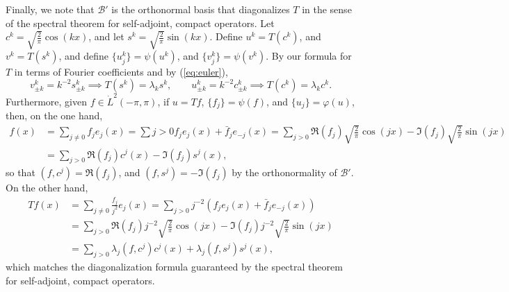 \documentclass{homework}
\begin{document}
\begin{arabicparts}
		Finally, we note that $\mathcal{B}'$ is the orthonormal basis that diagonalizes $T$ in the sense of the spectral theorem for self-adjoint, compact operators. Let $c^k = \sqrt{\frac{2}{\pi}}\cos(kx)$, and let $s^k = \sqrt{\frac{2}{\pi}}\sin(kx)$. Define $u^k = T(c^k)$, and $v^k = T(s^k)$, and define $\{u^k_j\} = \psi(u^k)$, and $\{v^k_j\} = \psi(v^k)$. By our formula for $T$ in terms of Fourier coefficients and by (\ref{eq:euler}),
		\begin{equation}
			v^k_{\pm k} = k^{-2}s^k_{\pm k} \implies T(s^k) = \lambda_ks^k, \qquad u^k_{\pm k} = k^{-2}c^k_{\pm k} \implies T(c^k) = \lambda_kc^k.
		\end{equation}
		Furthermore, given $f \in \dot{L}^2(-\pi,\pi)$, if $u = Tf$, $\{f_j\} = \psi(f)$, and $\{u_j\} = \varphi(u)$, then, on the one hand,
		\begin{align}
			f(x) &= \sum_{j\ne0}f_je_j(x) = \sum{j>0}f_je_j(x) + \bar{f}_{j}e_{-j}(x) = \sum_{j>0} \Re(f_j)\sqrt{\frac{2}{\pi}}\cos(jx) -\Im(f_j)\sqrt{\frac{2}{\pi}}\sin(jx) \\
			&= \sum_{j>0}\Re(f_j)c^j(x) - \Im(f_j)s^j(x),
		\end{align}
		so that $\left(f, c^j\right) = \Re(f_j)$, and $(f, s^j) = -\Im(f_j)$ by the orthonormality of $\mathcal{B}'$. On the other hand,
		\begin{align}
			Tf(x) &= \sum_{j\ne0}\frac{f_j}{j^2}e_j(x) = \sum_{j>0}j^{-2}(f_je_j(x) +\bar{f}_je_{-j}(x)) \\
			&= \sum_{j>0}\Re(f_j)j^{-2}\sqrt{\frac{2}{\pi}}\cos(jx) -\Im(f_j)j^{-2}\sqrt{\frac{2}{\pi}}\sin(jx) \\
			&= \sum_{j>0}\lambda_j(f,c^j)c^j(x) + \lambda_j(f,s^j)s^j(x),
		\end{align}
		which matches the diagonalization formula guaranteed by the spectral theorem for self-adjoint, compact operators.
	\end{arabicparts}
\end{document}
